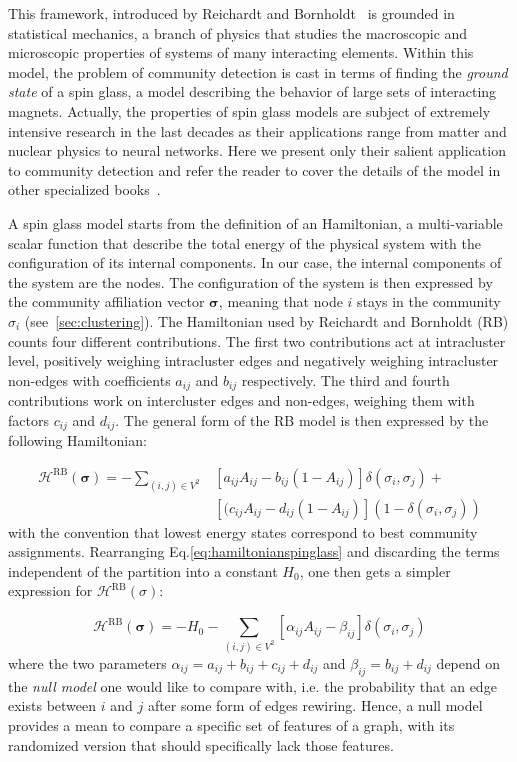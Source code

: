 This framework, introduced by Reichardt and Bornholdt~\cite{reichardt2006} is grounded in statistical mechanics, a branch of physics that studies the macroscopic and microscopic properties of systems of many interacting elements. Within this model, the problem of community detection is cast in terms of finding the \emph{ground state} of a spin glass, a model describing the behavior of large sets of interacting magnets.
Actually, the properties of spin glass models are subject of extremely intensive research in the last decades as their applications range from matter and nuclear physics to neural networks. Here we present only their salient application to community detection and refer the reader to cover the details of the model in other specialized books~\cite{Mezard1990}.

A spin glass model starts from the definition of an Hamiltonian, a multi-variable scalar function that describe the total energy of the physical system with the configuration of its internal components. In our case, the internal components of the system are the nodes. The configuration of the system is then expressed by the community affiliation vector $\boldsymbol\sigma$, meaning that node $i$ stays in the community $\sigma_i$ (see~\ref{sec:clustering}).
The Hamiltonian used by Reichardt and Bornholdt (RB) counts four different contributions. The first two contributions act at intracluster level, positively weighing intracluster edges and negatively weighing intracluster non-edges with coefficients $a_{ij}$ and $b_{ij}$ respectively. The third and fourth contributions work on intercluster edges and non-edges, weighing them with factors $c_{ij}$ and $d_{ij}$. The general form of the RB model is then expressed by the following Hamiltonian:

\begin{align}\label{eq:hamiltonianspinglass}
\mathcal{H}^{\textrm{RB}}(\boldsymbol \sigma) = - \sum_{(i,j)\in V^2} & \left[ a_{ij} A_{ij} - b_{ij}(1-A_{ij}) \right] \delta(\sigma_i,\sigma_j) + \nonumber \\ &  \left[ (c_{ij} A_{ij} - d_{ij}(1-A_{ij}) \right] (1-\delta(\sigma_i,\sigma_j))
\end{align}
with the convention that lowest energy states correspond to best community assignments.
Rearranging Eq.\ref{eq:hamiltonianspinglass} and discarding the terms independent of the partition into a constant $H_0$, one then gets a simpler expression for $\mathcal{H}^{\textrm{RB}}(\sigma)$:

\begin{equation}\label{eq:rbspinglass}
\mathcal{H}^{\textrm{RB}}(\boldsymbol \sigma) = -H_0 - \sum \limits_{(i,j)\in V^2} \left[ \alpha_{ij} A_{ij} - \beta_{ij} \right] \delta(\sigma_i,\sigma_j)
\end{equation}
where the two parameters $\alpha_{ij}=a_{ij}+b_{ij}+c_{ij}+d_{ij}$ and $\beta_{ij}=b_{ij}+d_{ij}$ depend on the \emph{null model} one would like to compare with, i.e. the probability that an edge exists between $i$ and $j$ after some form of edges rewiring. Hence, a null model provides a mean to compare a specific set of features of a graph, with its randomized version that should specifically lack those features.

